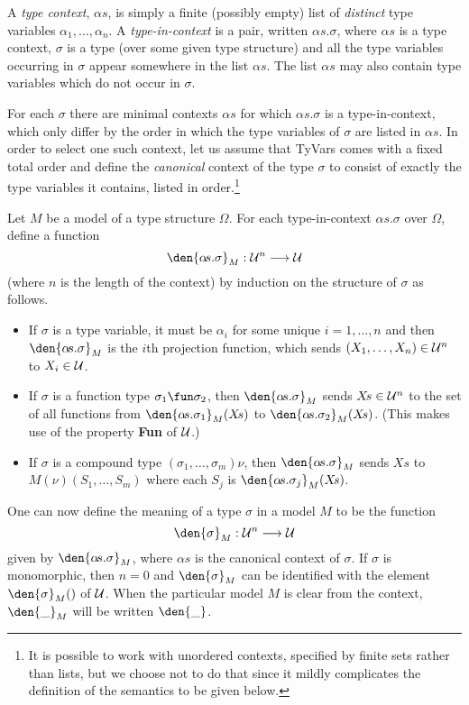 A {\em type context}, $\alpha\!s$, is simply a
finite (possibly empty) list of {\em distinct\/} type variables
$\alpha_{1},\ldots,\alpha_{n}$.  A {\em
type-in-context\/} is a pair, written
$\alpha\!s.\sigma$, where $\alpha\!s$ is a type context, $\sigma$ is a
type (over some given type structure) and all the type variables
occurring in $\sigma$ appear somewhere in the list $\alpha\!s$. The
list $\alpha\!s$ may also contain type variables which do not occur in
$\sigma$. 

For each $\sigma$ there are minimal contexts $\alpha\!s$ for which
$\alpha\!s.\sigma$ is a type-in-context, which only differ by the order
in which the type variables of $\sigma$ are listed in $\alpha\!s$. In
order to select one such context, let us assume that  {\sf TyVars}
comes with a fixed total order and define the {\em
canonical} context of the type $\sigma$ to consist of
exactly the type variables it contains, listed in order.\footnote{It is
possible to work with unordered contexts, specified by finite sets
rather than lists, but we choose not to do that since it mildly
complicates the definition of the semantics to be given
below.}

Let $M$ be a model of a type structure $\Omega$. For each
type-in-context
$\alpha\!s.\sigma$ over $\Omega$, define a function
\[ 
\den{\alpha\!s.\sigma}_{M}:{\cal U}^{n}\longrightarrow{\cal U}
\]
(where $n$ is the length of the context) by induction on the structure
of $\sigma$ as follows.
\begin{itemize}
 
\item If $\sigma$ is a type variable, it must be $\alpha_{i}$ for some unique
$i=1,\ldots,n$ and then $\den{\alpha\!s.\sigma}_{M}$ is the $i$\/th
projection function, which sends $(X_{1},\ldots,X_{n})\in{\cal U}^{n}$
to $X_{i}\in{\cal U}$.

\item If $\sigma$ is a function type
$\sigma_{1}\fun\sigma_{2}$, then $\den{\alpha\!s.\sigma}_M$ sends
$X\!s\in{\cal U}^n$ to the set of all functions 
from $\den{\alpha\!s.\sigma_1}_M(X\!s)$ to
$\den{\alpha\!s.\sigma_2}_M(X\!s)$. (This makes
use of the property {\bf Fun} of $\cal U$.)  

\item If $\sigma$ is a
compound type $(\sigma_{1},\ldots,\sigma_{m})\nu$, then
$\den{\alpha\!s.\sigma}_{M}$ sends $X\!s$ to
$M(\nu)(S_{1},\ldots,S_{m})$ where each $S_{j}$ is
$\den{\alpha\!s.\sigma_{j}}_{M}(X\!s)$.
\end{itemize}
One can now define the meaning of a type $\sigma$ in a model $M$ to be
the function
\[ 
\den{\sigma}_{M}:{\cal U}^{n}\longrightarrow{\cal U} 
\]
given by $\den{\alpha\!s.\sigma}_{M}$, where $\alpha\!s$ is the
canonical context of $\sigma$. If $\sigma$ is monomorphic, then $n=0$
and $\den{\sigma}_{M}$ can be identified with the element
$\den{\sigma}_{M}()$ of $\cal U$. When the particular model $M$ is
clear from the context, $\den{\_}_{M}$ will be written $\den{\_}$.

